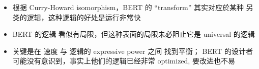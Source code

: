 \documentclass[16pt]{beamer}
\newcommand{\cc}[2]{#1}
\newcommand{\cc}[2]{#2}
\newcommand{\emp}[1]{{\color{violet}#1}}
\begin{document}
\begin{frame}
\begin{itemize}
\item 根据 Curry-Howard isomorphism，BERT 的 ``transform'' 其实对应於某种 \emp{另类的逻辑}，这种逻辑的好处是运行\emp{非常快}

\item BERT 的逻辑 看似有局限，但这种表面的局限未必阻止它是 universal 的逻辑

\item 关键是在 速度 与 逻辑的 expressive power 之间 找到平衡； BERT 的设计者可能没有意识到，事实上他们的逻辑已经非常 optimized, 要改进也不易
\end{itemize}
\end{frame}

\end{document}
